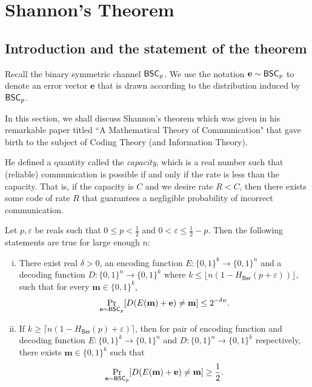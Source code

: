 \section{Shannon's Theorem}

\subsection{Introduction and the statement of the theorem}

Recall the binary symmetric channel $\mathsf{BSC}_p$. We use the notation $\textbf{e}\sim\mathsf{BSC}_p$ to denote an error vector $\textbf{e}$ that is drawn according to the distribution induced by $\mathsf{BSC}_p$.

\vspace{2mm}
In this section, we shall discuss Shannon's theorem which was given in his remarkable paper titled ``A Mathematical Theory of Communication" that gave birth to the subject of Coding Theory (and Information Theory).

\vspace{2mm}
He defined a quantity called the \textit{capacity}, which is a real number such that (reliable) communication is possible if and only if the rate is less than the capacity. That is, if the capacity is $C$ and we desire rate $R<C$, then there exists some code of rate $R$ that guarantees a negligible probability of incorrect communication.

\begin{theorem}
    Let $p,\varepsilon$ be reals such that $0\leq p<\frac{1}{2}$ and $0< \varepsilon\leq \frac{1}{2}-p$. Then the following statements are true for large enough $n$:
    \begin{enumerate}[(i)]
        \item There exist real $\delta>0$, an encoding function $E:\{0,1\}^k\to\{0,1\}^n$ and a decoding function $D:\{0,1\}^n\to\{0,1\}^k$ where $k\leq \lfloor n(1-H_\mathsf{Ber}(p+\varepsilon))\rfloor$, such that for every $\textbf{m}\in\{0,1\}^k$,
        $$\Pr_{\textbf{e}\sim\mathsf{BSC}_p}[D(E(\textbf{m})+\textbf{e})\neq \textbf{m}]\leq 2^{-\delta n}.$$
        \item If $k\geq\lceil n(1-H_\mathsf{Ber}(p)+\varepsilon)\rceil$, then for pair of encoding function and decoding function $E:\{0,1\}^k\to\{0,1\}^n$ and $D:\{0,1\}^n\to\{0,1\}^k$ respectively, there exists $\textbf{m}\in\{0,1\}^k$ such that
        $$\Pr_{\textbf{e}\sim\mathsf{BSC}_p}[D(E(\textbf{m})+\textbf{e})\neq \textbf{m}]\geq\frac{1}{2}.$$
    \end{enumerate}
\end{theorem}

